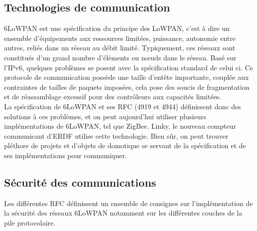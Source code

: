 	\subsection{Technologies de communication}
		6LoWPAN est une spécification du principe des LoWPAN, c'est à dire un ensemble d'équipements aux ressources limitées, puissance, autonomie entre autres, reliés dans un réseau au débit limité. Typiquement, ces réseaux sont constitués d'un grand nombre d'éléments ou nœuds dans le réseau.
		Basé sur l'IPv6, quelques problèmes se posent avec la spécification standard de celui ci. Ce protocole de communication possède une taille d'entête importante, couplée aux contraintes de tailles de paquets imposées, cela pose des soucis de fragmentation et de réassamblage excessif pour des contrôleurs aux capacités limitées.\\
		La spécification de 6LoWPAN et ses RFC (4919 et 4944) définissent donc des solutions à ces problèmes, et on peut aujourd'hui utiliser plusieurs implémentations de 6LoWPAN, tel que ZigBee. Linky, le nouveau compteur communicant d'ERDF utilise cette technologie. Bien sûr, on peut trouver pléthore de projets et d'objets de domotique se servant de la spécification et de ses implémentations pour communiquer.
		
		
	\subsection{Sécurité des communications}
		Les différentes RFC définissent un ensemble de consignes sur l'implémentation de la sécurité des réseaux 6LoWPAN notamment sur les différentes couches de la pile protocolaire.
		
